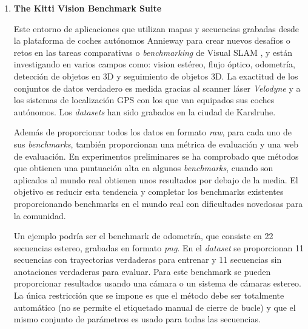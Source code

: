 \begin {enumerate}
SLAMBench está siendo una herramienta muy útil en robótica y Sistemas de Realidad Aumentada (AR). Aunque un gran número de algoritmos SLAM han sido presentados, no se ha investigado lo suficiente para tratar de unificar el interface de estos algoritmos, o realizar comparaciones de todas sus capacidades en conjunto. Esto presenta un problema ya que diferentes aplicaciones SLAM pueden tener diferentes requisitos funcionales y no funcionales. Por ejemplo, una solución para Realidad Aumentada desarrollada para móviles tendría que optimizar el consumo de energía, mientras que otra solución diseñada para vehículos de navegación autónoma estaría enfocada a funcionar con la mayor exactitud posible. SLAMBench2 es una herramienta de evaluación que compararía sistemas SLAM actuales y futuros, utilizando una lista extensible de \textit{datasets}, mientras utiliza una lista comparable de métricas de rendimiento. SLAMBench2 es un software que está disponible de manera pública.\footnote{https://github.com/pamela-project/slambench2} 

\item \textbf{The Kitti Vision Benchmark Suite }

Este entorno de aplicaciones que utilizan mapas y secuencias grabadas desde la plataforma de coches autónomos Annieway \cite{AnnieWay08} para crear nuevos desafíos o retos en las tareas comparativas o \textit{benchmarking} de Visual SLAM \cite{Geiger2012CVPR}, y están investigando en varios campos como: vision estéreo, flujo óptico, odometría, detección de objetos en 3D y seguimiento de objetos 3D.
La exactitud de los conjuntos de datos verdadero es medida gracias al scanner láser \textit{Velodyne} y a los sistemas de localización GPS con los que van equipados sus coches autónomos.
Los \textit{datasets} han sido grabados en la ciudad de Karslruhe.

Además de proporcionar todos los datos en formato \textit{raw}, para cada uno de sus \textit{benchmarks}, también proporcionan una métrica de evaluación y una web de evaluación. En experimentos preliminares se ha comprobado que métodos que obtienen una puntuación alta en algunos \textit{benchmarks}, cuando son aplicados al mundo real obtienen unos resultados por debajo de la media. El objetivo es reducir esta tendencia y completar los benchmarks existentes proporcionando benchmarks en el mundo real con dificultades novedosas para la comunidad. 

Un ejemplo podría ser el benchmark de odometría, que consiste en 22 secuencias estereo, grabadas en formato \textit{png}. En el \textit{dataset} se proporcionan 11 secuencias con trayectorias verdaderas para entrenar y 11 secuencias sin anotaciones verdaderas para evaluar. Para este benchmark se pueden proporcionar resultados usando una cámara o un sistema de cámaras estereo.
La única restricción que se impone es que el método debe ser totalmente automático (no se permite el etiquetado manual de cierre de bucle) y que el mismo conjunto de parámetros es usado para todas las secuencias.


\end{enumerate}
